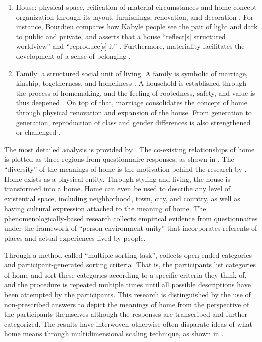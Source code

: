 \begin{enumerate}
    \item House: physical space, reification of material circumstances and home concept organization through its layout, furnishings, renovation, and decoration \parencite{samanani2019house}. For instance, Bourdieu compares how Kabyle people see the pair of light and dark to public and private, and asserts that a house ``reflect[s] structured worldview'' and ``reproduce[s] it'' \parencite{samanani2019house}. Furthermore, materiality facilitates the development of a sense of belonging \parencite{moore2000placing}.
    \item Family: a structured social unit of living. A family is symbolic of marriage, kinship, togetherness, and homeliness \parencite{samanani2019house}. A household is established through the process of homemaking, and the feeling of rootedness, safety, and value is thus deepened \parencite{samanani2019house,moore2000placing}. On top of that, marriage consolidates the concept of home through physical renovation and expansion of the house. From generation to generation, reproduction of class and gender differences is also strengthened or challenged \parencite{samanani2019house,mallett2004understanding}.
\end{enumerate}

The most detailed analysis is provided by \textcite{sixsmith1986meaning}. The co-existing relationships of home is plotted as three regions from questionnaire responses, as shown in  \parencite{sixsmith1986meaning}. The ``diversity'' of the meanings of home is the motivation behind the research by \textcite{sixsmith1986meaning}. Home exists as a physical entity. Through styling and living, the house is transformed into a home. Home can even be used to describe any level of existential space, including neighborhood, town, city, and country, as well as having cultural expression attached to the meaning of home. The phenomenologically-based research collects empirical evidence from questionnaires under the framework of ``person-environment unity'' that incorporates referents of places and actual experiences lived by people.

Through a method called ``multiple sorting task'', \textcite{sixsmith1986meaning} collects open-ended categories and participant-generated sorting criteria. That is, the participants list categories of home and sort these categories according to a specific criteria they think of, and the procedure is repeated multiple times until all possible descriptions have been attempted by the participants. This research is distinguished by the use of non-prescribed answers to depict the meanings of home from the perspective of the participants themselves although the responses are transcribed and further categorized. The results have interwoven otherwise often disparate ideas of what home means through multidimensional scaling technique, as shown in .

